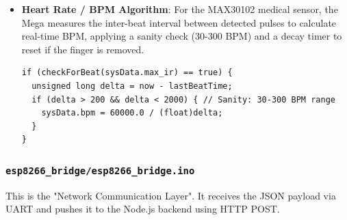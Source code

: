 \documentclass[12pt,a4paper]{article}
\newcommand{\Q}[1]{\textcolor{questioncolor}{\textbf{#1}}}
\newcommand{\codeinline}[1]{\texttt{\small #1}}
\begin{document}
\begin{itemize}
    \item \Q{Heart Rate / BPM Algorithm}:
    For the MAX30102 medical sensor, the Mega measures the inter-beat interval between detected pulses to calculate real-time BPM, applying a sanity check (30-300 BPM) and a decay timer to reset if the finger is removed.
\begin{verbatim}
if (checkForBeat(sysData.max_ir) == true) {
  unsigned long delta = now - lastBeatTime;
  if (delta > 200 && delta < 2000) { // Sanity: 30-300 BPM range
    sysData.bpm = 60000.0 / (float)delta;
  }
}
\end{verbatim}
\end{itemize}

\subsubsection*{\codeinline{esp8266\_bridge/esp8266\_bridge.ino}}
This is the "Network Communication Layer". It receives the JSON payload via UART and pushes it to the Node.js backend using HTTP POST.
\end{document}
